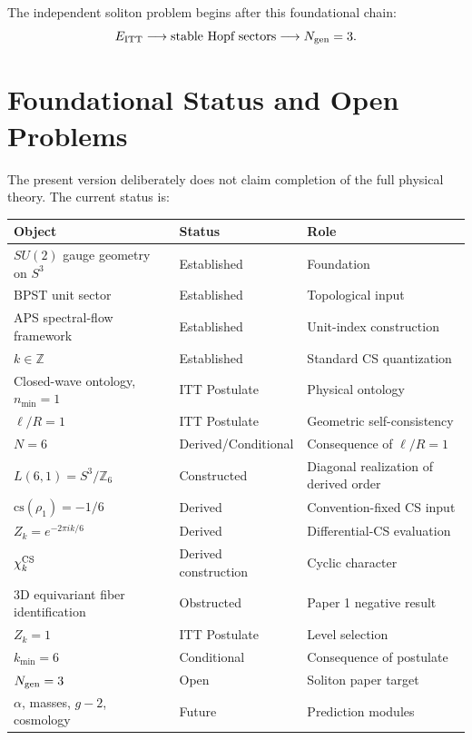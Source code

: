 \documentclass[11pt,a4paper]{article}
\begin{document}
The independent soliton problem begins after this foundational chain:
\begin{equation}
E_{\rm ITT}
\longrightarrow
\text{stable Hopf sectors}
\longrightarrow
N_{\rm gen}=3.
\end{equation}

\section{Foundational Status and Open Problems}

The present version deliberately does not claim completion of the full physical theory. The current status is:
\begin{center}
\small
\begin{tabular}{p{}p{}p{}}
\toprule
Object & Status & Role \\
\midrule
$SU(2)$ gauge geometry on $S^3$ & Established & Foundation \\
BPST unit sector & Established & Topological input \\
APS spectral-flow framework & Established & Unit-index construction \\
$k\in\mathbb Z$ & Established & Standard CS quantization \\
Closed-wave ontology, $n_{\min}=1$ & ITT Postulate & Physical ontology \\
$\ell/R=1$ & ITT Postulate & Geometric self-consistency \\
$N=6$ & Derived/Conditional & Consequence of $\ell/R=1$ \\
$L(6,1)=S^3/\mathbb Z_6$ & Constructed & Diagonal realization of derived order \\
$\mathrm{cs}(\rho_1)=-1/6$ & Derived & Convention-fixed CS input \\
$Z_k=e^{-2\pi i k/6}$ & Derived & Differential-CS evaluation \\
$\chi_k^{\rm CS}$ & Derived construction & Cyclic character \\
3D equivariant fiber identification & Obstructed & Paper 1 negative result \\
$Z_k=1$ & ITT Postulate & Level selection \\
$k_{\min}=6$ & Conditional & Consequence of postulate \\
$N_{\rm gen}=3$ & Open & Soliton paper target \\
$\alpha$, masses, $g-2$, cosmology & Future & Prediction modules \\
\bottomrule
\end{tabular}
\end{center}
\end{document}
